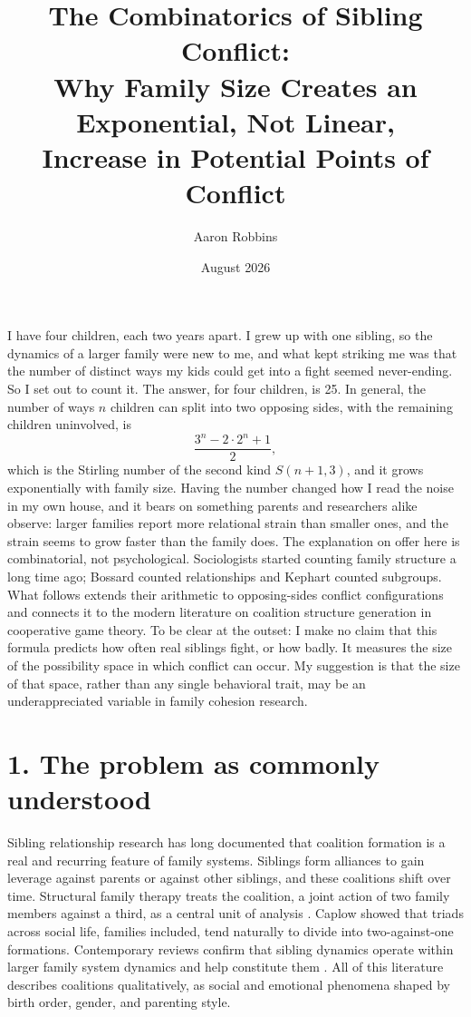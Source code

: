 \documentclass[11pt]{article}
\title{The Combinatorics of Sibling Conflict:\\
\large Why Family Size Creates an Exponential, Not Linear,\\
Increase in Potential Points of Conflict}
\author{Aaron Robbins}
\date{August 2026}
\begin{document}
\maketitle

\noindent
I have four children, each two years apart. I grew up with one sibling, so the
dynamics of a larger family were new to me, and what kept striking me was that the
number of distinct ways my kids could get into a fight seemed never-ending. So I set
out to count it. The answer, for four children, is 25. In general, the number of ways
$n$ children can split into two opposing sides, with the remaining children
uninvolved, is
\[
\frac{3^{n} - 2\cdot 2^{n} + 1}{2},
\]
which is the Stirling number of the second kind $S(n+1,3)$, and it grows
exponentially with family size. Having the number changed how I read the noise in my
own house, and it bears on something parents and researchers alike observe: larger
families report more relational strain than smaller ones, and the strain seems to
grow faster than the family does. The explanation on offer here is combinatorial, not
psychological. Sociologists started counting family structure a long time ago;
Bossard \cite{bossard1945} counted relationships and Kephart \cite{kephart1950}
counted subgroups. What follows extends their arithmetic to opposing-sides conflict
configurations and connects it to the modern literature on coalition structure
generation in cooperative game theory. To be clear at the outset: I make no claim
that this formula predicts how often real siblings fight, or how badly. It measures
the size of the possibility space in which conflict can occur. My suggestion is that
the size of that space, rather than any single behavioral trait, may be an
underappreciated variable in family cohesion research.

\section*{1. The problem as commonly understood}

Sibling relationship research has long documented that coalition formation is a real
and recurring feature of family systems. Siblings form alliances to gain leverage
against parents or against other siblings, and these coalitions shift over time.
Structural family therapy treats the coalition, a joint action of two family members
against a third, as a central unit of analysis \cite{minuchin1974}. Caplow
\cite{caplow1968} showed that triads across social life, families included, tend
naturally to divide into two-against-one formations. Contemporary reviews confirm
that sibling dynamics operate within larger family system dynamics and help
constitute them \cite{mchale2012, bank1982}. All of this literature describes
coalitions qualitatively, as social and emotional phenomena shaped by birth order,
gender, and parenting style.
\end{document}
